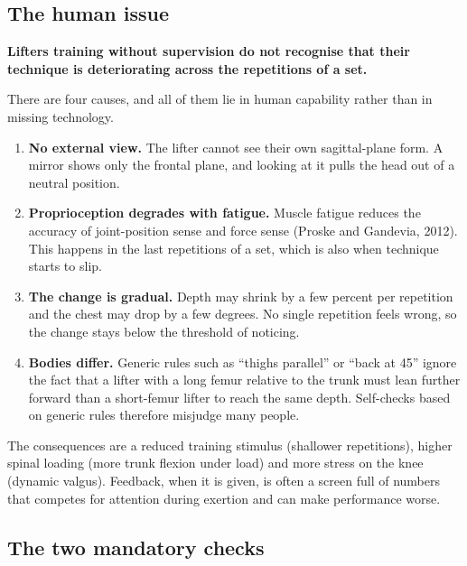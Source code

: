\documentclass[12pt]{article}
\begin{document}
\subsection{The human issue}

\begin{mdframed}[style=note]
\textbf{Lifters training without supervision do not recognise that their technique is deteriorating across the repetitions of a set.}
\end{mdframed}

There are four causes, and all of them lie in human capability rather than in missing technology.

\begin{enumerate}
    \item \textbf{No external view.} The lifter cannot see their own sagittal-plane form. A mirror shows only the frontal plane, and looking at it pulls the head out of a neutral position.
    \item \textbf{Proprioception degrades with fatigue.} Muscle fatigue reduces the accuracy of joint-position sense and force sense (Proske and Gandevia, 2012). This happens in the last repetitions of a set, which is also when technique starts to slip.
    \item \textbf{The change is gradual.} Depth may shrink by a few percent per repetition and the chest may drop by a few degrees. No single repetition feels wrong, so the change stays below the threshold of noticing.
    \item \textbf{Bodies differ.} Generic rules such as ``thighs parallel'' or ``back at 45\degree'' ignore the fact that a lifter with a long femur relative to the trunk must lean further forward than a short-femur lifter to reach the same depth. Self-checks based on generic rules therefore misjudge many people.
\end{enumerate}

The consequences are a reduced training stimulus (shallower repetitions), higher spinal loading (more trunk flexion under load) and more stress on the knee (dynamic valgus). Feedback, when it is given, is often a screen full of numbers that competes for attention during exertion and can make performance worse.

\subsection{The two mandatory checks}
\end{document}
